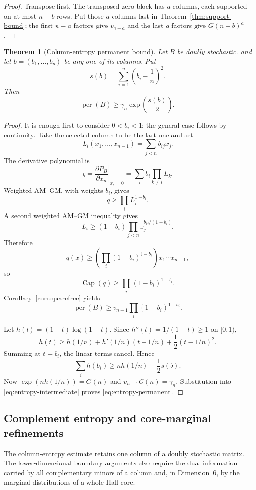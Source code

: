 \documentclass[11pt]{article}
\newtheorem{theorem}{Theorem}[section]
\theoremstyle{definition}
\newcommand{\per}{\operatorname{per}}
\newcommand{\pcap}{\operatorname{Cap}}
\newcommand{\1}{\mathbf{1}}
\begin{document}
\begin{proof}
Transpose first.  The transposed zero block has $a$ columns, each supported on at most $n-b$ rows.  Put those $a$ columns last in Theorem~\ref{thm:support-bound}; the first $n-a$ factors give $v_{n-a}$ and the last $a$ factors give $G(n-b)^a$.
\end{proof}

\begin{theorem}[Column-entropy permanent bound]\label{thm:column-entropy}
Let $B$ be doubly stochastic, and let $b=(b_1,\dots,b_n)$ be any one of its columns.  Put
\[
 s(b)=\sum_{i=1}^n\left(b_i-\frac1n\right)^2.
\]
Then
\[
 \per(B)\ge\gamma_n\exp\left(\frac{s(b)}2\right).
 \tag{3.10}\label{eq:entropy-permanent}
\]
\end{theorem}

\begin{proof}
It is enough first to consider $0<b_i<1$; the general case follows by continuity.  Take the selected column to be the last one and set
\[
 L_i(x_1,\dots,x_{n-1})=\sum_{j<n}b_{ij}x_j.
\]
The derivative polynomial is
\[
 q=\left.\frac{\partial P_B}{\partial x_n}\right|_{x_n=0}
 =\sum_i b_i\prod_{k\ne i}L_k.
\]
Weighted AM--GM, with weights $b_i$, gives
\[
 q\ge\prod_iL_i^{1-b_i}.
\]
A second weighted AM--GM inequality gives
\[
 L_i\ge(1-b_i)
 \prod_{j<n}x_j^{b_{ij}/(1-b_i)}.
\]
Therefore
\[
 q(x)\ge
 \left(\prod_i(1-b_i)^{1-b_i}\right)x_1\cdots x_{n-1},
\]
so
\[
 \pcap(q)\ge\prod_i(1-b_i)^{1-b_i}.
\]
Corollary~\ref{cor:squarefree} yields
\[
 \per(B)\ge
 v_{n-1}\prod_i(1-b_i)^{1-b_i}.
 \tag{3.11}\label{eq:entropy-intermediate}
\]

Let $h(t)=(1-t)\log(1-t)$.  Since $h''(t)=1/(1-t)\ge1$ on $[0,1)$,
\[
 h(t)\ge h(1/n)+h'(1/n)(t-1/n)+\frac12(t-1/n)^2.
\]
Summing at $t=b_i$, the linear terms cancel.  Hence
\[
 \sum_i h(b_i)
 \ge nh(1/n)+\frac12s(b).
\]
Now $\exp(nh(1/n))=G(n)$ and $v_{n-1}G(n)=\gamma_n$.  Substitution into \eqref{eq:entropy-intermediate} proves \eqref{eq:entropy-permanent}.
\end{proof}


\subsection{Complement entropy and core-marginal refinements}
\setcounter{equation}{11}
\renewcommand{\theequation}{3.\arabic{equation}}
\renewcommand{\theHequation}{capacityentropy.\arabic{equation}}

The column-entropy estimate retains one column of a doubly stochastic
matrix.  The lower-dimensional boundary arguments also require the dual
information carried by all complementary minors of a column and, in
Dimension~6, by the marginal distributions of a whole Hall core.
\end{document}
